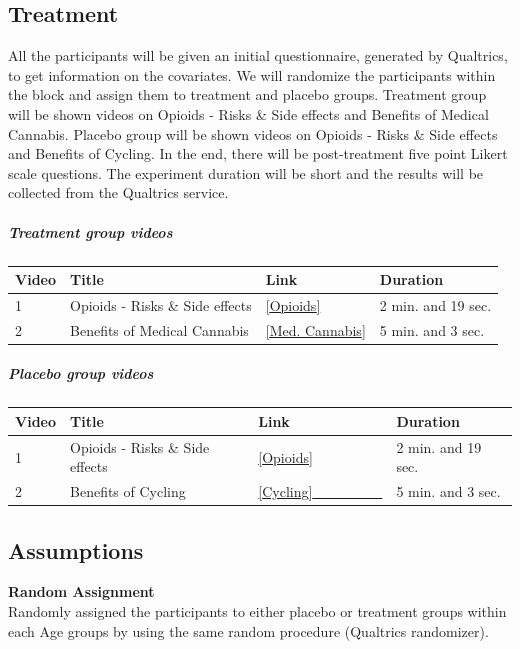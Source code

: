 \documentclass[
]{article}
\begin{document}
\hypertarget{treatment}{%
\subsection{Treatment}\label{treatment}}

All the participants will be given an initial questionnaire, generated
by Qualtrics, to get information on the covariates. We will randomize
the participants within the block and assign them to treatment and
placebo groups. Treatment group will be shown videos on Opioids - Risks
\& Side effects and Benefits of Medical Cannabis. Placebo group will be
shown videos on Opioids - Risks \& Side effects and Benefits of Cycling.
In the end, there will be post-treatment five point Likert scale
questions. The experiment duration will be short and the results will be
collected from the Qualtrics service.

\hypertarget{treatment-group-videos}{%
\subparagraph{Treatment group videos}\label{treatment-group-videos}}

\begin{longtable}[]{@{}llll@{}}
\toprule
Video & Title & Link & Duration\tabularnewline
\midrule
\endhead
1 & Opioids - Risks \& Side effects &
\href{https://youtu.be/y0mfzDAs1BE}{{[}Opioids{]}} & 2 min. and 19
sec.\tabularnewline
2 & Benefits of Medical Cannabis &
\href{https://youtu.be/OhJ0YaJXrJo}{{[}Med. Cannabis{]}} & 5 min. and 3
sec.\tabularnewline
\bottomrule
\end{longtable}

\hypertarget{placebo-group-videos}{%
\subparagraph{Placebo group videos}\label{placebo-group-videos}}

\begin{longtable}[]{@{}llll@{}}
\toprule
Video & Title & Link & Duration\tabularnewline
\midrule
\endhead
1 & Opioids - Risks \& Side effects &
\href{https://youtu.be/y0mfzDAs1BE}{{[}Opioids{]}} & 2 min. and 19
sec.\tabularnewline
2 & Benefits of Cycling &
\href{https://youtu.be/xWo0FOwZVX0}{{[}Cycling{]}~~~~~~~~~~} & 5 min.
and 3 sec.\tabularnewline
\bottomrule
\end{longtable}

\hypertarget{assumptions}{%
\subsection{Assumptions}\label{assumptions}}

\textbf{Random Assignment}\\
Randomly assigned the participants to either placebo or treatment groups
within each Age groups by using the same random procedure (Qualtrics
randomizer).
\end{document}
